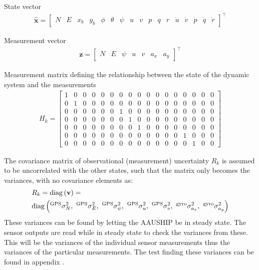 State vector
\begin{align}
\hat{\mathbf x}=
\begin{bmatrix}
N & E & x_b & y_b & \phi & \theta & \psi & u & v & p & q & r & \dot u & \dot v & \dot p & \dot q & \dot r
\end{bmatrix}^\top
\end{align}

Measurement vector
\begin{align}
\mathbf z=
\begin{bmatrix}
N & E & \psi & u & v & a_x & a_y
\end{bmatrix}^\top
\end{align}

Measurement matrix defining the relationship between the state of the dynamic system and the measurements
\begin{align}
H_k =
\begin{bmatrix}
1 & 0 & 0 & 0 & 0 & 0 & 0 & 0 & 0 & 0 & 0 & 0 & 0 & 0 & 0 & 0 & 0 \\
0 & 1 & 0 & 0 & 0 & 0 & 0 & 0 & 0 & 0 & 0 & 0 & 0 & 0 & 0 & 0 & 0 \\
0 & 0 & 0 & 0 & 0 & 0 & 1 & 0 & 0 & 0 & 0 & 0 & 0 & 0 & 0 & 0 & 0 \\
0 & 0 & 0 & 0 & 0 & 0 & 0 & 1 & 0 & 0 & 0 & 0 & 0 & 0 & 0 & 0 & 0 \\
0 & 0 & 0 & 0 & 0 & 0 & 0 & 0 & 1 & 0 & 0 & 0 & 0 & 0 & 0 & 0 & 0 \\
0 & 0 & 0 & 0 & 0 & 0 & 0 & 0 & 0 & 0 & 0 & 0 & 0 & 1 & 0 & 0 & 0 \\
0 & 0 & 0 & 0 & 0 & 0 & 0 & 0 & 0 & 0 & 0 & 0 & 0 & 0 & 1 & 0 & 0 
\end{bmatrix}
\end{align}

The covariance matrix of observational (measurement) uncertainty $R_k$ is assumed to be uncorrelated with the other states, such that the matrix only becomes the variances, with no covariance elements as:
\begin{align}
&R_k = \diag{\mathbf{v}} =\\ \nonumber
&\diag{^\text{GPS}\sigma_{N}^2,\ ^\text{GPS}\sigma_{E}^2,\ ^\text{GPS}\sigma_{\psi}^2,\ ^\text{GPS}\sigma_{u}^2,\ ^\text{GPS}\sigma_{v}^2,\ ^\text{gyro}\sigma_{a_x}^2,\ ^\text{gyro}\sigma_{a_y}^2}
\end{align}
These variances can be found by letting the AAUSHIP be in steady state. The sensor outputs are read while in steady state to check the variances from these. This will be the variances of the individual sensor measurements thus the variances of the particular measurements. The test finding these variances can be found in appendix .

